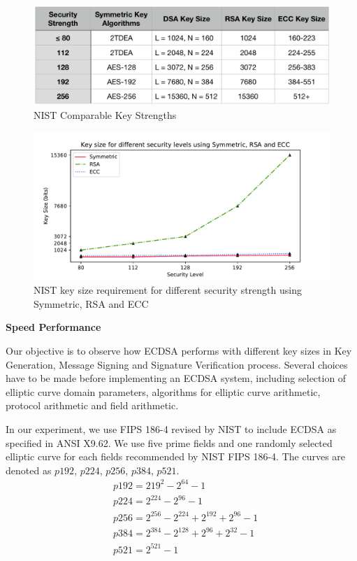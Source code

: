 \documentclass[10pt,sigconf]{acmart}
\begin{document}
\begin{figure}[H]
\centering
\includegraphics[scale=0.4]{NIST_Comparable_Strengths.png}
\caption{\small{NIST Comparable Key Strengths}}
\label{fig:NIST_Comparable_Strengths}
\end{figure}

\begin{figure}
\centering
\includegraphics[scale=0.45]{NIST_KeySize_Compare_Security_Strength}
\caption{\small{NIST key size requirement for different security strength using Symmetric, RSA and ECC}}
\label{fig:NIST_KeySize_Compare_Security_Strength}
\end{figure}

\noindent \textbf{Speed Performance}

Our objective is to observe how ECDSA performs with different key sizes in Key Generation, Message Signing and Signature Verification process. Several choices have to be made before implementing an ECDSA system, including selection of elliptic curve domain parameters, algorithms for elliptic curve arithmetic, protocol arithmetic and field arithmetic. 

In our experiment, we use FIPS 186-4 \cite{Kerry13fipspub} revised by NIST to include ECDSA as specified in ANSI X9.62. We use five prime fields and one randomly selected elliptic curve for each fields recommended by NIST FIPS 186-4. The curves are denoted as $p192$, $p224$, $p256$, $p384$, $p521$. 
\begin{align*}
    & p192 = 219^{2} - 2^{64} - 1 \\
    & p224 = 2^{224} - 2^{96} - 1 \\
    & p256 = 2^{256} - 2^{224} + 2^{192} + 2^{96} - 1 \\
    & p384 = 2^{384} - 2^{128} + 2^{96} + 2^{32} - 1 \\
    & p521 = 2^{521} - 1
\end{align*}
\end{document}
